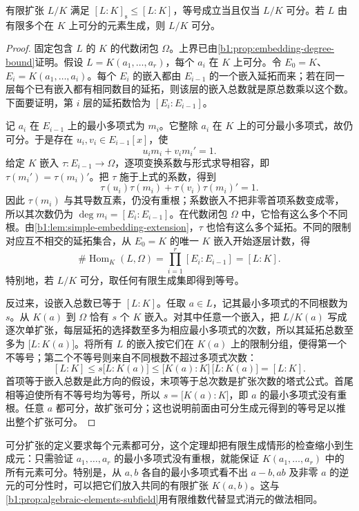 \begin{theorem}\label{b1:thm:separable-embeddings}
	有限扩张 \(L/K\) 满足 \([L:K]_{\mathrm s}\leq[L:K]\)，等号成立当且仅当 \(L/K\) 可分。若 \(L\) 由有限多个在 \(K\) 上可分的元素生成，则 \(L/K\) 可分。
\end{theorem}
\begin{proof}
	固定包含 \(L\) 的 \(K\) 的代数闭包 \(\Omega\)。上界已由\cref{b1:prop:embedding-degree-bound}证明。假设 \(L=K(a_1,\ldots,a_r)\)，每个 \(a_i\) 在 \(K\) 上可分。令 \(E_0=K\)、\(E_i=K(a_1,\ldots,a_i)\)。每个 \(E_i\) 的嵌入都由 \(E_{i-1}\) 的一个嵌入延拓而来；若在同一层每个已有嵌入都有相同数目的延拓，则该层的嵌入总数就是原总数乘以这个数。下面要证明，第 \(i\) 层的延拓数恰为 \([E_i:E_{i-1}]\)。

	记 \(a_i\) 在 \(E_{i-1}\) 上的最小多项式为 \(m_i\)。它整除 \(a_i\) 在 \(K\) 上的可分最小多项式，故仍可分。于是存在 \(u_i,v_i\in E_{i-1}[x]\)，使
	\[
		u_i m_i+v_i m_i'=1.
	\]
	给定 \(K\) 嵌入 \(\tau:E_{i-1}\rightarrow\Omega\)，逐项变换系数与形式求导相容，即 \(\tau(m_i')=\tau(m_i)'\)。把 \(\tau\) 施于上式的系数，得到
	\[
		\tau(u_i)\tau(m_i)+\tau(v_i)\tau(m_i)'=1.
	\]
	因此 \(\tau(m_i)\) 与其导数互素，仍没有重根；系数嵌入不把非零首项系数变成零，所以其次数仍为 \(\deg m_i=[E_i:E_{i-1}]\)。在代数闭包 \(\Omega\) 中，它恰有这么多个不同根。由\cref{b1:lem:simple-embedding-extension}，\(\tau\) 也恰有这么多个延拓。不同的限制对应互不相交的延拓集合，从 \(E_0=K\) 的唯一 \(K\) 嵌入开始逐层计数，得
	\[
		\#\operatorname{Hom}_K(L,\Omega) =\prod_{i=1}^r[E_i:E_{i-1}]=[L:K].
	\]
	特别地，若 \(L/K\) 可分，取任何有限生成集即得到等号。

	反过来，设嵌入总数已等于 \([L:K]\)。任取 \(a\in L\)，记其最小多项式的不同根数为 \(s\)。从 \(K(a)\) 到 \(\Omega\) 恰有 \(s\) 个 \(K\) 嵌入。对其中任意一个嵌入，把 \(L/K(a)\) 写成逐次单扩张，每层延拓的选择数至多为相应最小多项式的次数，所以其延拓总数至多为 \(\bigl[L:K(a)\bigr]\)。将所有 \(L\) 的嵌入按它们在 \(K(a)\) 上的限制分组，便得第一个不等号；第二个不等号则来自不同根数不超过多项式次数：
	\[
		[L:K]\leq s\bigl[L:K(a)\bigr]\leq\bigl[K(a):K\bigr]\,\bigl[L:K(a)\bigr]=[L:K].
	\]
	首项等于嵌入总数是此方向的假设，末项等于总次数是扩张次数的塔式公式。首尾相等迫使所有不等号均为等号，所以 \(s=\bigl[K(a):K\bigr]\)，即 \(a\) 的最小多项式没有重根。任意 \(a\) 都可分，故扩张可分；这也说明前面由可分生成元得到的等号足以推出整个扩张可分。
\end{proof}

可分扩张的定义要求每个元素都可分，这个定理却把有限生成情形的检查缩小到生成元：只需验证 \(a_1,\ldots,a_r\) 的最小多项式没有重根，就能保证 \(K(a_1,\ldots,a_r)\) 中的所有元素可分。特别是，从 \(a,b\) 各自的最小多项式看不出 \(a-b,ab\) 及非零 \(a\) 的逆元的可分性时，可以把它们放入共同的有限扩张 \(K(a,b)\)。这与\cref{b1:prop:algebraic-elements-subfield}用有限维数代替显式消元的做法相同。

